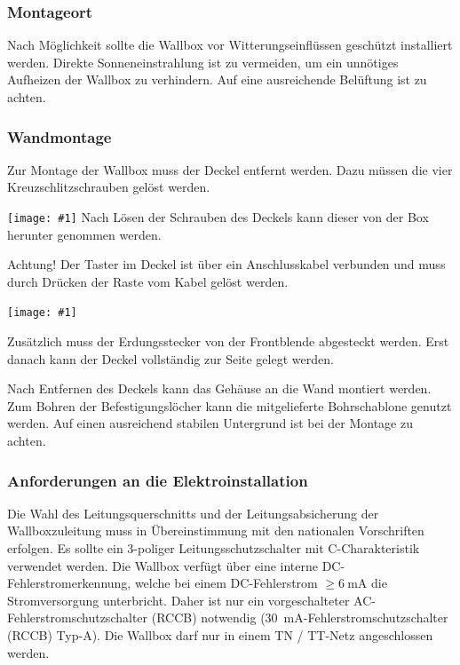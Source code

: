 \documentclass[a4paper,10pt]{article}
\newcommand{\hint}[1]{\begin{tcolorbox}[colback=boxgray,colframe=black,coltext=
white,title=Hinweis]#1\end{tcolorbox}}
\newcommand{\gfx}[1]{\texttt{[image: \#1]}}
\begin{document}
\begin{multicols*}{2}
	\subsubsection{Montageort}
	Nach Möglichkeit sollte die Wallbox vor Witterungseinflüssen geschützt
	installiert werden. Direkte Sonneneinstrahlung ist zu vermeiden, um ein
	unnötiges Aufheizen der Wallbox zu verhindern. Auf eine ausreichende Belüftung
	ist zu achten.

	\subsubsection{Wandmontage}\label{wandmontage}
	Zur Montage der Wallbox muss der Deckel entfernt werden. Dazu müssen die
	vier Kreuzschlitzschrauben gelöst werden.

	\gfx{./img_warp2/resized/warp_screw_points_ready}
	Nach Lösen der Schrauben des Deckels kann dieser von der Box herunter genommen
	werden.

	\hint{Achtung! Der Taster im Deckel ist über ein Anschlusskabel verbunden und muss
		durch Drücken der Raste vom Kabel gelöst werden.}

	\gfx{./img_warp2/resized/warp2_button_and_gnd_600}


	Zusätzlich muss der Erdungsstecker von der Frontblende abgesteckt werden.
	Erst danach kann der Deckel vollständig zur Seite gelegt werden.


	Nach Entfernen des Deckels kann das Gehäuse an die Wand montiert werden. Zum
	Bohren der Befestigungslöcher kann die mitgelieferte Bohrschablone genutzt
	werden. Auf einen ausreichend stabilen Untergrund ist bei der Montage zu
	achten.

	\subsubsection{Anforderungen an die Elektroinstallation}
	Die Wahl des Leitungsquerschnitts und der Leitungsabsicherung der
	Wallboxzuleitung muss in Übereinstimmung mit den nationalen Vorschriften
	erfolgen. Es sollte ein 3-poliger Leitungsschutzschalter mit C-Charakteristik
	verwendet werden.
	Die Wallbox verfügt über eine interne DC-Fehlerstromerkennung, welche
	bei einem DC-Fehlerstrom $\geq \SI{6}{\milli\ampere}$ die Stromversorgung
	unterbricht. Daher ist nur ein vorgeschalteter AC-Fehlerstromschutzschalter
	(RCCB) notwendig (\SI{30}{\milli\ampere}-Fehlerstromschutzschalter (RCCB) Typ-A).
	Die Wallbox darf nur in einem TN / TT-Netz angeschlossen werden.


\end{multicols*}
\end{document}
